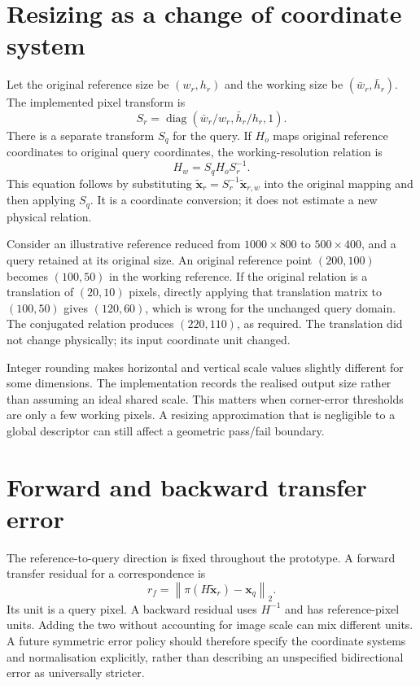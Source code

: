 \section{Resizing as a change of coordinate system}
Let the original reference size be $(w_r,h_r)$ and the working size be $(\bar w_r,\bar h_r)$. The implemented pixel transform is
\begin{equation}
 S_r=\operatorname{diag}(\bar w_r/w_r,\bar h_r/h_r,1).
\end{equation}
There is a separate transform $S_q$ for the query. If $H_o$ maps original reference coordinates to original query coordinates, the working-resolution relation is
\begin{equation}
 H_w=S_qH_oS_r^{-1}.
\end{equation}
This equation follows by substituting $\widetilde{\mathbf x}_r=S_r^{-1}\widetilde{\mathbf x}_{r,w}$ into the original mapping and then applying $S_q$. It is a coordinate conversion; it does not estimate a new physical relation.

Consider an illustrative reference reduced from $1000\times800$ to $500\times400$, and a query retained at its original size. An original reference point $(200,100)$ becomes $(100,50)$ in the working reference. If the original relation is a translation of $(20,10)$ pixels, directly applying that translation matrix to $(100,50)$ gives $(120,60)$, which is wrong for the unchanged query domain. The conjugated relation produces $(220,110)$, as required. The translation did not change physically; its input coordinate unit changed.

Integer rounding makes horizontal and vertical scale values slightly different for some dimensions. The implementation records the realised output size rather than assuming an ideal shared scale. This matters when corner-error thresholds are only a few working pixels. A resizing approximation that is negligible to a global descriptor can still affect a geometric pass/fail boundary.

\section{Forward and backward transfer error}
The reference-to-query direction is fixed throughout the prototype. A forward transfer residual for a correspondence is
\begin{equation}
 r_f=\left\|\pi(H\widetilde{\mathbf x}_r)-\mathbf x_q\right\|_2.
\end{equation}
Its unit is a query pixel. A backward residual uses $H^{-1}$ and has reference-pixel units. Adding the two without accounting for image scale can mix different units. A future symmetric error policy should therefore specify the coordinate systems and normalisation explicitly, rather than describing an unspecified bidirectional error as universally stricter.

